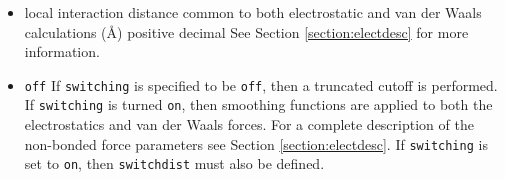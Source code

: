 \begin{itemize}


\item
{}
{local interaction distance common to both electrostatic 
and van der Waals calculations (\AA)}
{positive decimal}
{%
See Section \ref{section:electdesc} for more information.}

\item
{}
{{\tt off}}
{If {\tt switching} is
specified to be {\tt off}, then a truncated cutoff is performed.
If {\tt switching} is turned {\tt on}, then smoothing functions
are applied to both the electrostatics and van der Waals forces.
For a complete description of the non-bonded force parameters see
Section \ref{section:electdesc}.  If {\tt switching} is set to
{\tt on}, then {\tt switchdist} must also be defined.}



\end{itemize}
